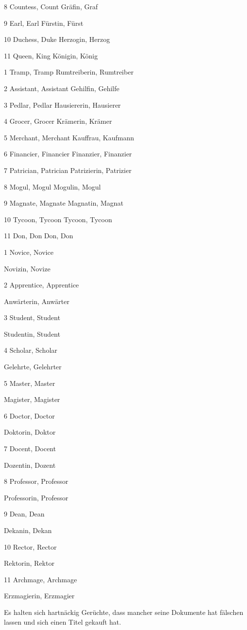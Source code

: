 \documentclass[a4paper,11pt]{book}
\begin{document}
8  Countess, Count  Gräfin, Graf

9  Earl, Earl  Fürstin, Fürst

10  Duchess, Duke  Herzogin, Herzog

11  Queen, King  Königin, König

1  Tramp, Tramp  Rumtreiberin, Rumtreiber

2  Assistant, Assistant  Gehilfin, Gehilfe

3  Pedlar, Pedlar  Hausiererin, Hausierer

4  Grocer, Grocer  Krämerin, Krämer

5  Merchant, Merchant  Kauffrau, Kaufmann

6  Financier, Financier  Finanzier, Finanzier

7  Patrician, Patrician  Patrizierin, Patrizier

8  Mogul, Mogul  Mogulin, Mogul

9  Magnate, Magnate  Magnatin, Magnat

10  Tycoon, Tycoon  Tycoon, Tycoon

11  Don, Don  Don, Don

1  Novice, Novice

Novizin, Novize

2  Apprentice, Apprentice

Anwärterin, Anwärter

3  Student, Student

Studentin, Student

4  Scholar, Scholar

Gelehrte, Gelehrter

5  Master, Master

Magister, Magister

6  Doctor, Doctor

Doktorin, Doktor

7  Docent, Docent

Dozentin, Dozent

8  Professor, Professor

Professorin, Professor

9  Dean, Dean

Dekanin, Dekan

10 Rector, Rector

Rektorin, Rektor

11 Archmage, Archmage

Erzmagierin, Erzmagier

Es halten sich hartnäckig Gerüchte, dass mancher seine Dokumente hat fälschen lassen und sich einen Titel gekauft hat.
\end{document}
